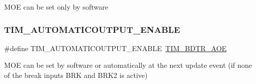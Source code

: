 M\+OE can be set only by software \mbox{\label{group___t_i_m___a_o_e___bit___set___reset_ga09e7f3f768b0f122f13fd47771f07ddf}} 
\subsubsection{\texorpdfstring{TIM\_AUTOMATICOUTPUT\_ENABLE}{TIM\_AUTOMATICOUTPUT\_ENABLE}}
{\footnotesize\ttfamily \#define T\+I\+M\+\_\+\+A\+U\+T\+O\+M\+A\+T\+I\+C\+O\+U\+T\+P\+U\+T\+\_\+\+E\+N\+A\+B\+LE~\mbox{\hyperlink{group___peripheral___registers___bits___definition_ga59f15008050f91fa3ecc9eaaa971a509}{T\+I\+M\+\_\+\+B\+D\+T\+R\+\_\+\+A\+OE}}}

M\+OE can be set by software or automatically at the next update event (if none of the break inputs B\+RK and B\+R\+K2 is active) 
